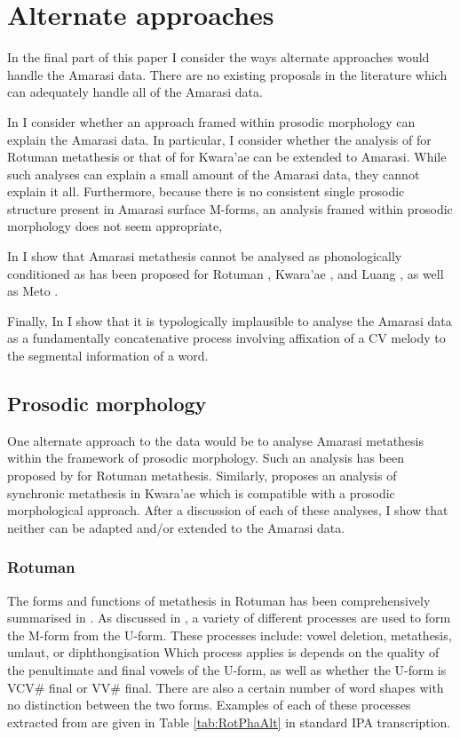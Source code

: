 \section{Alternate approaches}\label{sec:AltApp}
In the final part of this paper I consider
the ways alternate approaches would handle the Amarasi data.
There are no existing proposals in the literature which can
adequately handle all of the Amarasi data.

In  I consider whether an approach framed within
prosodic morphology \citep{mccpr90,mccpr93} can explain the Amarasi data.
In particular, I consider whether the analysis of \cite{mcc00} for Rotuman metathesis
or that of \cite{he04} for Kwara'ae can be extended to Amarasi.
While such analyses can explain a small amount of the Amarasi data,
they cannot explain it all.
Furthermore, because there is no consistent single prosodic structure present
in Amarasi surface M-forms, an analysis framed within prosodic morphology
does not seem appropriate,

In  I show that Amarasi
metathesis cannot be analysed as phonologically conditioned
as has been proposed for Rotuman \citep{haki98,mcc00},
Kwara'ae \citep{he04}, and Luang \citep{tata15},
as well as Meto \citep{mccko96}.

Finally, In  I show that it
is typologically implausible to analyse the
Amarasi data as a fundamentally concatenative process
involving affixation of a CV melody to the segmental information of a word.

\subsection{Prosodic morphology}\label{sec:ProMor}
One alternate approach to the data would be to analyse
Amarasi metathesis within the framework of prosodic morphology.
Such an analysis has been proposed by \citet{mcc00} for Rotuman metathesis.
Similarly, \cite{he04} proposes an analysis of synchronic metathesis in
Kwara'ae which is compatible with a prosodic morphological approach.
After a discussion of each of these analyses,
I show that neither can be adapted and/or extended to the Amarasi data.

\subsubsection{Rotuman}\label{sec:ProMorRot}
The forms and functions of metathesis in Rotuman
has been comprehensively summarised in .
As discussed in ,
a variety of different processes are used to form the
M-form from the U-form. These processes include:
vowel deletion, metathesis, umlaut, or diphthongisation
Which process applies is depends on the quality of the penultimate
and final vowels of the U-form, as well as
whether the U-form is VCV{\#} final or VV{\#} final.
There are also a certain number of word shapes with no distinction between the two forms.
Examples of each of these processes extracted from \cite{ch40}
are given in Table \ref{tab:RotPhaAlt} in standard IPA transcription.

